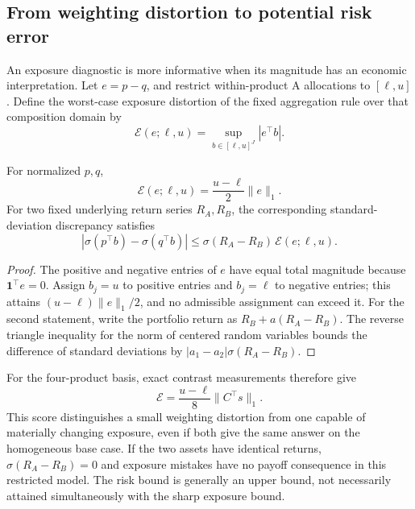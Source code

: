 \subsection{From weighting distortion to potential risk error}
An exposure diagnostic is more informative when its magnitude has an economic interpretation. Let $e=p-q$, and restrict within-product A allocations to $[\ell,u]$. Define the worst-case exposure distortion of the fixed aggregation rule over that composition domain by
\begin{equation}
\mathcal E(e;\ell,u)=\sup_{b\in[\ell,u]^J}|e^\top b|.
\end{equation}
\begin{proposition}\label{prop:impact}
For normalized $p,q$,
\begin{equation}
\mathcal E(e;\ell,u)=\frac{u-\ell}{2}\|e\|_1.
\end{equation}
For two fixed underlying return series $R_A,R_B$, the corresponding standard-deviation discrepancy satisfies
\begin{equation}
|\sigma(p^\top b)-\sigma(q^\top b)|
\leq \sigma(R_A-R_B)\,\mathcal E(e;\ell,u).
\label{eq:impact}
\end{equation}
\end{proposition}
\begin{proof}
The positive and negative entries of $e$ have equal total magnitude because $\mathbf1^\top e=0$. Assign $b_j=u$ to positive entries and $b_j=\ell$ to negative entries; this attains $(u-\ell)\|e\|_1/2$, and no admissible assignment can exceed it. For the second statement, write the portfolio return as $R_B+a(R_A-R_B)$. The reverse triangle inequality for the norm of centered random variables bounds the difference of standard deviations by $|a_1-a_2|\sigma(R_A-R_B)$.
\end{proof}
For the four-product basis, exact contrast measurements therefore give
\begin{equation}
\mathcal E=\frac{u-\ell}{8}\|C^\top s\|_1.
\end{equation}
This score distinguishes a small weighting distortion from one capable of materially changing exposure, even if both give the same answer on the homogeneous base case. If the two assets have identical returns, $\sigma(R_A-R_B)=0$ and exposure mistakes have no payoff consequence in this restricted model. The risk bound is generally an upper bound, not necessarily attained simultaneously with the sharp exposure bound.

